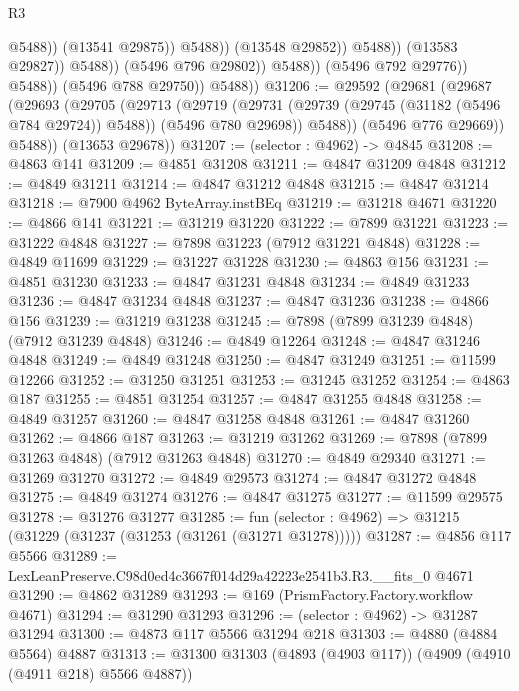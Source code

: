 \begin{lexlean}{R3}
\begin{coremodule}
                                            @5488))
                                        (@13541 @29875))
                                      @5488))
                                  (@13548 @29852))
                                @5488))
                            (@13583 @29827))
                          @5488))
                      (@5496 @796 @29802))
                    @5488))
                (@5496 @792 @29776))
              @5488))
          (@5496 @788 @29750))
        @5488))
@31206 := @29592
    (@29681
      (@29687
        (@29693
          (@29705
            (@29713
              (@29719
                (@29731 (@29739 (@29745 (@31182 (@5496 @784 @29724)) @5488)) (@5496 @780 @29698))
                @5488))
            (@5496 @776 @29669))
          @5488))
      (@13653 @29678))
@31207 := (selector : @4962) -> @4845
@31208 := @4863 @141
@31209 := @4851 @31208
@31211 := @4847 @31209 @4848
@31212 := @4849 @31211
@31214 := @4847 @31212 @4848
@31215 := @4847 @31214
@31218 := @7900 @4962 ByteArray.instBEq
@31219 := @31218 @4671
@31220 := @4866 @141
@31221 := @31219 @31220
@31222 := @7899 @31221
@31223 := @31222 @4848
@31227 := @7898 @31223 (@7912 @31221 @4848)
@31228 := @4849 @11699
@31229 := @31227 @31228
@31230 := @4863 @156
@31231 := @4851 @31230
@31233 := @4847 @31231 @4848
@31234 := @4849 @31233
@31236 := @4847 @31234 @4848
@31237 := @4847 @31236
@31238 := @4866 @156
@31239 := @31219 @31238
@31245 := @7898 (@7899 @31239 @4848) (@7912 @31239 @4848)
@31246 := @4849 @12264
@31248 := @4847 @31246 @4848
@31249 := @4849 @31248
@31250 := @4847 @31249
@31251 := @11599 @12266
@31252 := @31250 @31251
@31253 := @31245 @31252
@31254 := @4863 @187
@31255 := @4851 @31254
@31257 := @4847 @31255 @4848
@31258 := @4849 @31257
@31260 := @4847 @31258 @4848
@31261 := @4847 @31260
@31262 := @4866 @187
@31263 := @31219 @31262
@31269 := @7898 (@7899 @31263 @4848) (@7912 @31263 @4848)
@31270 := @4849 @29340
@31271 := @31269 @31270
@31272 := @4849 @29573
@31274 := @4847 @31272 @4848
@31275 := @4849 @31274
@31276 := @4847 @31275
@31277 := @11599 @29575
@31278 := @31276 @31277
@31285 := fun (selector : @4962) => @31215 (@31229 (@31237 (@31253 (@31261 (@31271 @31278)))))
@31287 := @4856 @117 @5566
@31289 := LexLeanPreserve.C98d0ed4c3667f014d29a42223e2541b3.R3.__fits_0 @4671
@31290 := @4862 @31289
@31293 := @169 (PrismFactory.Factory.workflow @4671)
@31294 := @31290 @31293
@31296 := (selector : @4962) -> @31287 @31294
@31300 := @4873 @117 @5566 @31294 @218
@31303 := @4880 (@4884 @5564) @4887
@31313 := @31300 @31303 (@4893 (@4903 @117)) (@4909 (@4910 (@4911 @218) @5566 @4887))

\end{coremodule}
\end{lexlean}
